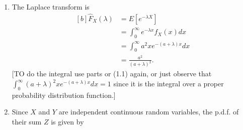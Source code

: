 \documentclass[11pt,a4paper]{article}
\begin{document}
\begin{enumerate}
\begin{enumerate}
      \begin{align*}
        \mu
        &= E[X]\\
        &= \int_0^\infty xf_X(x)dx\\
        &= \int_0^\infty a^2x^2e^{-ax}dx\\
        &= \frac{2}{a}.
      \end{align*}
      [To do the integral either integrate by parts or use (1.1) with $n = 3$]\\
      A similar integration yields
      \begin{align*}
        E[X^2]
        &= \int_0^\infty x^2f_X(x)dx\\
        &= \int_0^\infty a^2x^3e^{-ax}dx\\
        &= \frac{6}{a^2},
      \end{align*}
      and hence the variance
      \begin{align*}
        \sigma^2
        &= E[X^2] - \mu^2\\
        &= \frac{6}{a^2}-\left(\frac{2}{a}\right)\\
        &= \frac{2}{a^2}.
      \end{align*}
      Note that the question means "find" in the sense of calculate, not merely in the sense of look-up somewhere! Of course, one can also obtain the moments by calculating the moment generating function but that is not actually necessary for this part of the question, and is essentially equivalent to calculating the Laplace transform in (c). [Why?]
      \item The Laplace transform is
      \begin{equation}\tag{1.2}
        \begin{aligned}[b]
          \hat{F}_X(\lambda)
          &= E[e^{-\lambda X}]\\
          &= \int_0^\infty e^{-\lambda x}f_X(x)dx\\
          &= \int_0^\infty a^2xe^{-(a + \lambda)x}dx\\
          &= \frac{a^2}{(a + \lambda)^2}.
        \end{aligned}
      \end{equation}
      [TO do the integral use parts or (1.1) again, or just observe that $\int_0^\infty(a + \lambda)^2\allowbreak xe^{-(a + \lambda)x}dx = 1$ since it is the integral over a proper probability distribution function.]
      \item Since $X$ and $Y$ are independent continuous random variables, the p.d.f. of their sum $Z$ is given by
      \begin{equation}\tag{1.3}

\end{equation}
\end{enumerate}
\end{enumerate}
\end{document}
